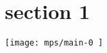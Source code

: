 \documentclass[11pt]{article}
\begin{document}
\section*{section 1}
      \texttt{[image:  mps/main-0 ]}
\end{document}
